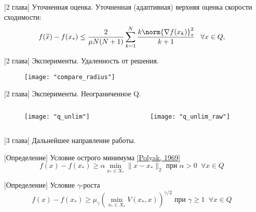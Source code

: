 \begin{frame}{[2 глава] Уточненная оценка.}
    Уточненная (адаптивная) верхняя оценка скорости сходимости: 
    $$
    f(\widehat{x}) - f(x_*) \leq \frac{2}{\mu N (N+1)} \sum_{k=1}^{N} \frac{k \norm{\nabla f(x_k)}_*^2 }{k+1}\;\;\; \forall x \in Q,
    $$
\end{frame}


\begin{frame}{[2 глава] Эксперименты. Удаленность от решения.}
\begin{figure}
    \centering
    \texttt{[image: "compare\_radius"]}
\end{figure}
\end{frame}


\begin{frame}{[2 глава] Эксперименты. Неограниченное Q.}
\begin{columns}
    \begin{column}{0.55\textwidth}
    \begin{figure}
        \centering
        \texttt{[image: "q\_unlim"]}
    \end{figure}
    \end{column}
        
    \begin{column}{0.55\textwidth}
    \begin{figure}
        \centering
        \texttt{[image: "q\_unlim\_raw"]}
    \end{figure}
    \end{column}
\end{columns}
\end{frame}


\begin{frame}{[3 глава] Дальнейшее направление работы.}
    \begin{block}{[Определение] Условие острого минимума \href{https://doi.org/10.1016/0041-5553(69)90061-5}{[Polyak, 1969]}}
        \begin{equation}
            f(x) - f(x_*) \geq \alpha \min_{x_* \in X_*}{\| x - x_* \|_2} \text{ при } \alpha > 0\;\; \forall x \in Q
        \end{equation}
    \end{block}
    \begin{block}{[Определение] Условие $\gamma$-роста}
       \begin{equation} \label{gamma-growth}
           f(x) - f(x_*) \geq \mu_{\gamma}\left(\min_{x_* \in X_*}{V(x_*,x)}\right)^{\gamma/2} \text{ при } \gamma \geq 1\;\; \forall x \in Q
       \end{equation}
    \end{block}
\end{frame}

